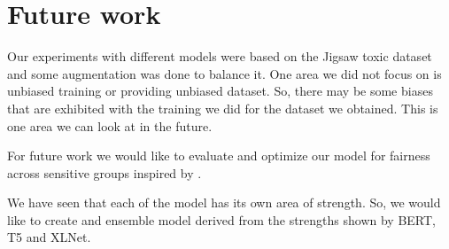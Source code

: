\documentclass[11pt,a4paper]{article}
\begin{document}
\section{Future work}
Our experiments with different models were based on the Jigsaw toxic dataset and some augmentation was done to balance it. One area we did not focus on is unbiased training or providing unbiased dataset. So, there may be some biases that are exhibited with the training we did for the dataset we obtained. This is one area we can look at in the future.

For future work we would like to evaluate and optimize our model for fairness across sensitive groups inspired by \cite{baldini2021your}.

We have seen that each of the model has its own area of strength. So, we would like to create and  ensemble model derived from the strengths shown by BERT, T5 and XLNet.


\newpage




\end{document}
